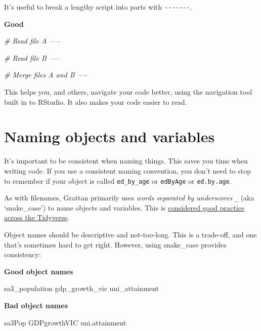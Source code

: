 \documentclass[]{book}
\newenvironment{Shaded}{\begin{snugshade}}{\end{snugshade}}
\newcommand{\CommentTok}[1]{\textcolor[rgb]{0.56,0.35,0.01}{\textit{#1}}}
\newcommand{\NormalTok}[1]{#1}
\begin{document}
It's useful to break a lengthy script into parts with \texttt{-\/-\/-\/-\/-\/-\/-}.

\textbf{Good}

\begin{Shaded}
\begin{Highlighting}[]
\CommentTok{# Read file A -----}


\CommentTok{# Read file B -----}

\CommentTok{# Merge files A and B ----}
\end{Highlighting}
\end{Shaded}

This helps you, and others, navigate your code better, using the navigation tool built in to RStudio. It also makes your code easier to read.

\hypertarget{naming-objects-and-variables}{%
\chapter{Naming objects and variables}\label{naming-objects-and-variables}}

It's important to be consistent when naming things. This saves you time when writing code. If you use a consistent naming convention, you don't need to stop to remember if your object is called \texttt{ed\_by\_age} or \texttt{edByAge} or \texttt{ed.by.age}.

As with filenames, Grattan primarily uses \emph{words separated by underscores} \texttt{\_} (aka `snake\_case') to name objects and variables. This is \href{https://style.tidyverse.org/syntax.html\#object-names}{considered good practice across the Tidyverse}.

Object names should be descriptive and not-too-long. This is a trade-off, and one that's sometimes hard to get right. However, using snake\_case provides consistency:

\textbf{Good object names}

\begin{Shaded}
\begin{Highlighting}[]
\NormalTok{sa3_population}
\NormalTok{gdp_growth_vic}
\NormalTok{uni_attainment}
\end{Highlighting}
\end{Shaded}

\textbf{Bad object names}

\begin{Shaded}
\begin{Highlighting}[]
\NormalTok{sa3Pop}
\NormalTok{GDPgrowthVIC}
\NormalTok{uni.attainment}
\end{Highlighting}
\end{Shaded}
\end{document}
